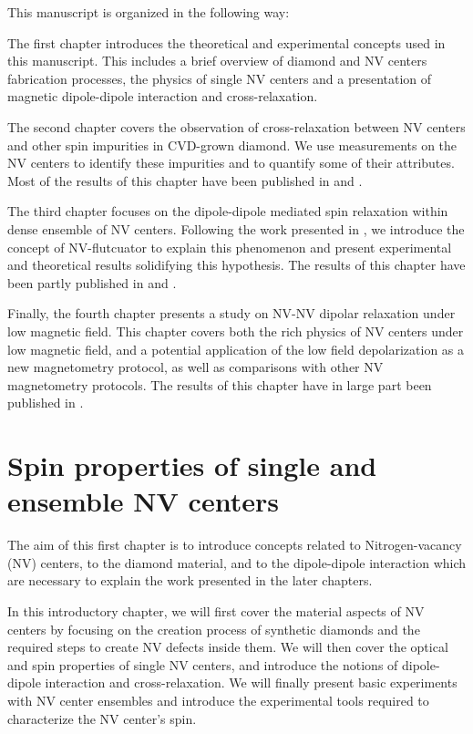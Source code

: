 \documentclass[a4paper, 11pt]{report}
\begin{document}
\bigskip
This manuscript is organized in the following way:

\medskip
The first chapter introduces the theoretical and experimental concepts used in this manuscript. This includes a brief overview of diamond and NV centers fabrication processes, the physics of single NV centers and a presentation of magnetic dipole-dipole interaction and cross-relaxation.

The second chapter covers the observation of cross-relaxation between NV centers and other spin impurities in CVD-grown diamond. We use measurements on the NV centers to identify these impurities and to quantify some of their attributes. Most of the results of this chapter have been published in \citep{pellet2021optical} and \citep{ngambou2022improving}.

The third chapter focuses on the dipole-dipole mediated spin relaxation within dense ensemble of NV centers. Following the work presented in \citep{choi2017depolarization}, we introduce the concept of NV-flutcuator to explain this phenomenon and present experimental and theoretical results solidifying this hypothesis. The results of this chapter have been partly published in \citep{pellet2022spin} and \citep{pellet2021magnetic}.

Finally, the fourth chapter presents a study on NV-NV dipolar relaxation under low magnetic field. This chapter covers both the rich physics of NV centers under low magnetic field, and a potential application of the low field depolarization as a new magnetometry protocol, as well as comparisons with other NV magnetometry protocols. The results of this chapter have in large part been published in \citep{pellet2022spin}.


\chapter{Spin properties of single and ensemble NV centers}
The aim of this first chapter is to introduce concepts related to Nitrogen-vacancy (NV) centers, to the diamond material, and to the dipole-dipole interaction which are necessary to explain the work presented in the later chapters.

In this introductory chapter, we will first cover the material aspects of NV centers by focusing on the creation process of synthetic diamonds and the required steps to create NV defects inside them. We will then cover the optical and spin properties of single NV centers, and introduce the notions of dipole-dipole interaction and cross-relaxation. We will finally present basic experiments with NV center ensembles and introduce the experimental tools required to characterize the NV center's spin. 
\end{document}
